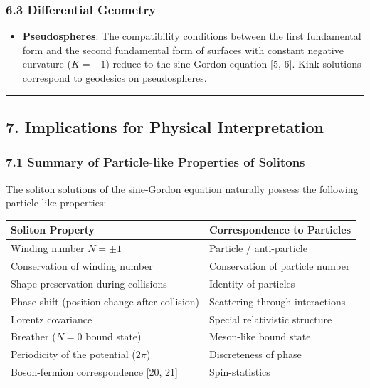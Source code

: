 \documentclass[a4paper,11pt]{article}
\providecommand{\tightlist}{\setlength{\itemsep}{0pt}\setlength{\parskip}{0pt}}
\newcounter{none}
\begin{document}
\subsubsection{6.3 Differential Geometry}\label{differential-geometry}

\begin{itemize}
\tightlist
\item
  \textbf{Pseudospheres}: The compatibility conditions between the first
  fundamental form and the second fundamental form of surfaces with
  constant negative curvature (\(K = -1\)) reduce to the sine-Gordon
  equation {[}5, 6{]}. Kink solutions correspond to geodesics on
  pseudospheres.
\end{itemize}

\begin{center}\rule{0.5\linewidth}{0.5pt}\end{center}

\subsection{7. Implications for Physical
Interpretation}\label{implications-for-physical-interpretation}

\subsubsection{7.1 Summary of Particle-like Properties of
Solitons}\label{summary-of-particle-like-properties-of-solitons}

The soliton solutions of the sine-Gordon equation naturally possess the
following particle-like properties:

{\def\LTcaptype{none} %
\begin{longtable}[]{@{}
  >{\centering\arraybackslash}p{}
  >{\centering\arraybackslash}p{}@{}}
\toprule\noalign{}
\begin{minipage}[b]{\linewidth}\centering
Soliton Property
\end{minipage} & \begin{minipage}[b]{\linewidth}\centering
Correspondence to Particles
\end{minipage} \\
\midrule\noalign{}
\endhead
\bottomrule\noalign{}
\endlastfoot
Winding number \(N = \pm 1\) & Particle / anti-particle \\
Conservation of winding number & Conservation of particle number \\
Shape preservation during collisions & Identity of particles \\
Phase shift (position change after collision) & Scattering through
interactions \\
Lorentz covariance & Special relativistic structure \\
Breather (\(N = 0\) bound state) & Meson-like bound state \\
Periodicity of the potential (\(2\pi\)) & Discreteness of phase \\
Boson-fermion correspondence {[}20, 21{]} & Spin-statistics \\
\end{longtable}
}
\end{document}
